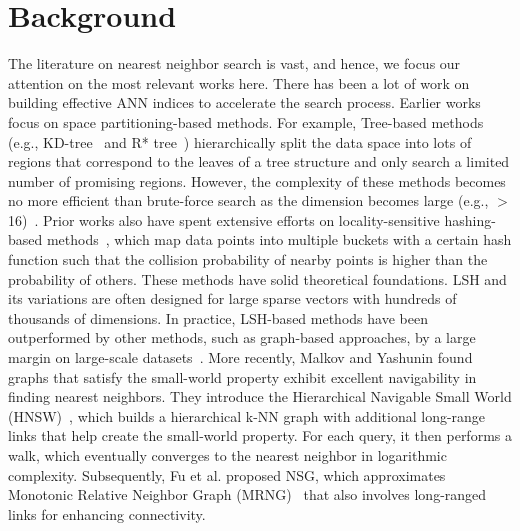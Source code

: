 \vspace{-1em}
\section{Background}\label{sec:background}

The literature on nearest neighbor search is vast, and hence, we focus our attention on the most relevant works here.  
There has been a lot of work on building effective ANN indices to accelerate the search process. Earlier works focus on space partitioning-based methods. For example, Tree-based methods (e.g., KD-tree~\cite{silpa2008optimised} and R* tree~\cite{r-star-tree}) hierarchically split the data space into lots of regions that correspond to the leaves of a tree structure and only search a limited number of promising regions. However, the complexity of these methods becomes no more efficient than brute-force search as the dimension becomes large (e.g., $>$16)~\cite{worst-case-kdtree}. 
Prior works also have spent extensive efforts on locality-sensitive hashing-based methods~\cite{indyk1998approximate,datar2004locality,andoni2006near,andoni2015practical}, which map data points into multiple buckets with a certain hash function such that the collision probability of nearby points is higher than the probability of others. These methods have solid theoretical foundations. LSH and its variations are often designed for large sparse vectors with hundreds of thousands of dimensions. In practice, LSH-based methods have been outperformed by other methods, such as graph-based approaches, by a large margin on large-scale datasets~\cite{ann-benchmark,hnsw,nsg}. 
More recently, Malkov and Yashunin found graphs that satisfy the small-world property exhibit excellent navigability in finding nearest neighbors. They introduce the Hierarchical Navigable Small World (HNSW)~\cite{hnsw}, which builds a hierarchical k-NN graph with additional long-range links that help create the small-world property. For each query, it then performs a walk, which eventually converges to the nearest neighbor in logarithmic complexity. Subsequently, Fu et al. proposed NSG, which approximates Monotonic Relative Neighbor Graph (MRNG)~\cite{nsg} that also involves long-ranged links for enhancing connectivity. 

